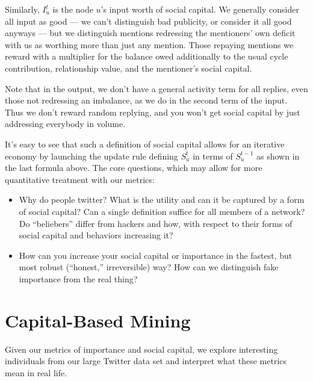 \documentclass[10pt,oneside]{memoir}
\begin{document}
Similarly, $I_{u}^{t}$ is the node $u$'s input worth of social capital. We generally consider all input as good — we can't distinguish bad publicity, or consider it all good anyways — but we distinguish mentions redressing the mentioners' own deficit with us as worthing more than just any mention. Those repaying mentions we reward with a multiplier for the balance owed additionally to the usual cycle contribution, relationship value, and the mentioner's social capital.

Note that in the output, we don't have a general activity term for all replies, even those not redressing an imbalance, as we do in the second term of the input. Thus we don't reward random replying, and you won't get social capital by just addressing everybody in volume.

It's easy to see that such a definition of social capital allows for an iterative economy by launching the update rule defining $S_{u}^{t}$ in terms of $S_{u}^{t-1}$ as shown in the last formula above.
The core questions, which may allow for more quantitative treatment with our metrics:


\begin{itemize}


\item Why do people twitter? What is the utility and can it be captured by a form of social capital? Can a single definition suffice for all members of a network? Do ``beliebers'' differ from hackers and how, with respect to their forms of social capital and behaviors increasing it?




\item How can you increase your social capital or importance in the fastest, but most robust (``honest,'' irreversible) way? How can we distinguish fake importance from the real thing?



\end{itemize}

\pagebreak \section{Capital-Based Mining}
\label{capital-basedmining}

Given our metrics of importance and social capital, we explore interesting individuals from our large Twitter data set and interpret what these metrics mean in real life. 
\end{document}
